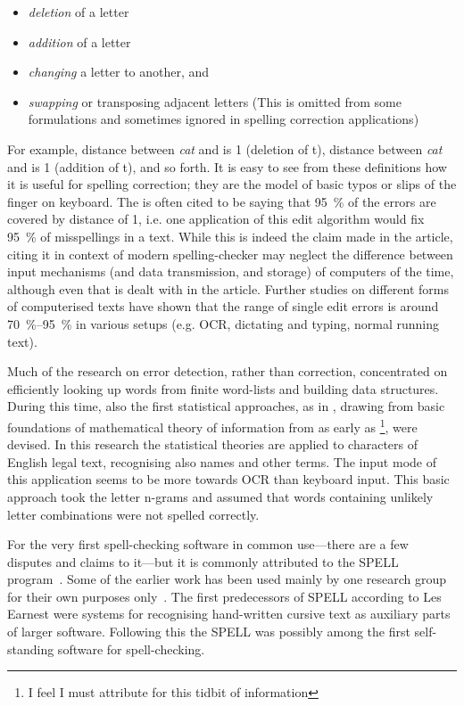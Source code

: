 \documentclass[officiallayout]{unihelcompling}
\newcommand\misspelt{\bgroup\markoverwith
{\textcolor{red}{\lower3.5pt\hbox{\sixly \char58}}}\ULon}
\begin{document}
\begin{itemize}
    \item \emph{deletion} of a letter
    \item \emph{addition} of a letter
    \item \emph{changing} a letter to another, and
    \item \emph{swapping} or transposing adjacent letters
        (This is omitted from some formulations and sometimes ignored in
        spelling correction applications)
\end{itemize}

For example, distance between \emph{cat} and \misspelt{ca} is 1 (deletion of
t), distance between \emph{cat} and \misspelt{catt} is 1 (addition of t), and
so forth.  It is easy to see from these definitions how it is useful for
spelling correction; they are the model of basic typos or slips of the finger
on keyboard. The \citep{damerau1964technique} is often cited to be saying that
95~\% of the errors are covered by distance of 1, i.e. one application of this
edit algorithm would fix 95~\% of misspellings in a text. While this is indeed
the claim made in the article, citing it in context of modern spelling-checker
may neglect the difference between input mechanisms (and data transmission, and
storage) of computers of the time, although even that is dealt with in the
article. Further studies on different forms of computerised texts have shown
that the range of single edit errors is around 70~\%--95~\% in various setups
(e.g. OCR, dictating and typing, normal running text).

Much of the research on error detection, rather than correction, concentrated
on efficiently looking up words from finite word-lists and building data
structures. During this time, also the first statistical approaches, as in
\citet{raviv1967decision}, drawing from basic foundations of mathematical
theory of information from as early as
\citet{shannon1948mathematical}\footnote{I feel I must attribute
\citet{liberman2012noisily} for this tidbit of information}, were devised. In
this research the statistical theories are applied to characters of English
legal text, recognising also names and other terms. The input mode of this
application seems to be more towards OCR than keyboard input. This basic
approach took the letter n-grams and assumed that words containing unlikely
letter combinations were not spelled correctly.

For the very first spell-checking software in common use---there are a few
disputes and claims to it---but it is commonly attributed to the SPELL
program~\citep{gorin1971spell}.  Some of the earlier work has been used mainly
by one research group for their own purposes 
only~\citep{earnest2011first,earnest2012first}. The first predecessors of SPELL
according to Les Earnest were systems for recognising hand-written cursive text
as auxiliary parts of larger software. Following this the SPELL was possibly
among the first self-standing software for spell-checking.
\end{document}
